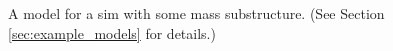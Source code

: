 \documentclass[12pt,preprint]{aastex}
\begin{document}
\begin{figure}
{  }
  \caption[result 6975 (ASW000195x)]{A model for a sim with some mass
    substructure. (See Section \ref{sec:example_models} for details.)}
  \label{fig:6975}
\end{figure}
  
\end{document}
